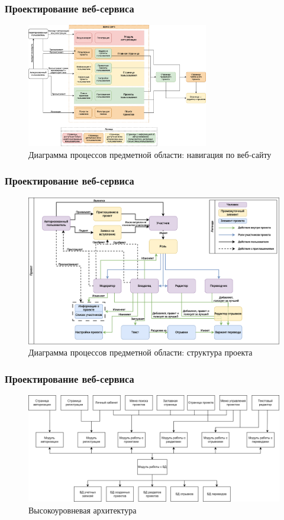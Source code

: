 \documentclass[hyperref={unicode}]{beamer}
\begin{document}
\begin{frame}
	\frametitle{Проектирование веб-сервиса}
	\begin{figure}
	\includegraphics[width=300px]{images/pagesdiagram1.png}
	\caption{Диаграмма процессов предметной области: навигация по веб-сайту}
	\end{figure}
\end{frame}


\begin{frame}
	\frametitle{Проектирование веб-сервиса}
	\begin{figure}
	\includegraphics[width=\textwidth]{images/pagesdiagram2.png}
	\caption{Диаграмма процессов предметной области: структура проекта}
	\end{figure}
\end{frame}


\begin{frame}
	\frametitle{Проектирование веб-сервиса}
	\begin{figure}
	\includegraphics[width=\textwidth]{images/architecturediagram.png}
	\caption{Высокоуровневая архитектура}
	\end{figure}
\end{frame}
\end{document}
